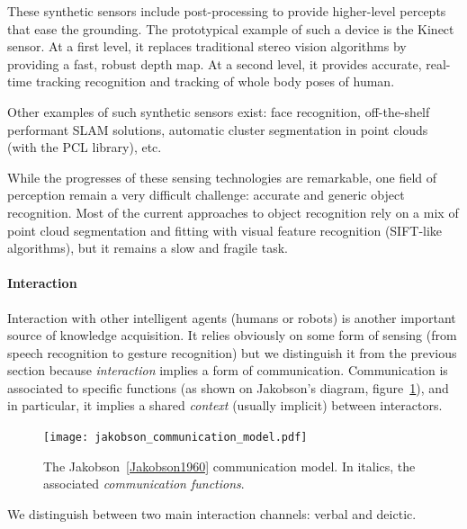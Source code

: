 \documentclass[a4paper, twocolumn]{article}
\begin{document}
These synthetic sensors include post-processing to provide higher-level
percepts that ease the grounding. The prototypical example of such a device is
the Kinect sensor. At a first level, it replaces traditional stereo vision
algorithms by providing a fast, robust depth map. At a second level, it
provides accurate, real-time tracking recognition and tracking of whole body
poses of human.

Other examples of such synthetic sensors exist: face recognition, off-the-shelf
performant SLAM solutions, automatic cluster segmentation in point clouds (with
the PCL library), etc.

While the progresses of these sensing technologies are remarkable, one field of
perception remain a very difficult challenge: accurate and generic object
recognition. Most of the current approaches to object recognition rely on a mix
of point cloud segmentation and fitting with visual feature recognition
(SIFT-like algorithms), but it remains a slow and fragile task.


\paragraph{Interaction}

Interaction with other intelligent agents (humans or robots) is another
important source of knowledge acquisition. It relies obviously on some form of
sensing (from speech recognition to gesture recognition) but we distinguish it
from the previous section because \emph{interaction} implies a form of
communication. Communication is associated to specific functions
(as shown on Jakobson's diagram, figure~\ref{fig|communication-model}), and in particular, it implies a shared
\emph{context} (usually implicit) between interactors.

\begin{figure}
    \centering
    \texttt{[image: jakobson\_communication\_model.pdf]}

    \caption{The Jakobson~\ref{Jakobson1960} communication model. In italics,
    the associated \emph{communication functions}.}

    \label{fig|communication-model}
\end{figure}

We distinguish between two main interaction channels: verbal and deictic.

\begin{scriptsize}
\begin{center}
\end{center}
\end{scriptsize}
\end{document}
